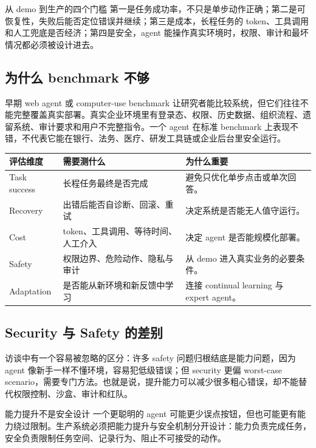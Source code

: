 \documentclass[a4paper]{article}
\begin{document}
\begin{importantbox}{从 demo 到生产的四个门槛}
第一是任务成功率，不只是单步动作正确；第二是可恢复性，失败后能否定位错误并继续；第三是成本，长程任务的 token、工具调用和人工兜底是否经济；第四是安全，agent 能操作真实环境时，权限、审计和最坏情况都必须被设计进去。
\end{importantbox}

\subsection{为什么 benchmark 不够}

早期 web agent 或 computer-use benchmark 让研究者能比较系统，但它们往往不能完整覆盖真实部署。真实企业环境里有登录态、权限、历史数据、组织流程、遗留系统、审计要求和用户不完整指令。一个 agent 在标准 benchmark 上表现不错，不代表它能在银行、法务、医疗、研发工具链或企业后台里安全运行。

\noindent\begin{tabularx}{\textwidth}{p{}p{}X}
\toprule
评估维度 & 需要测什么 & 为什么重要 \\
\midrule
Task success & 长程任务最终是否完成 & 避免只优化单步点击或单次回答。 \\
Recovery & 出错后能否自诊断、回滚、重试 & 决定系统是否能无人值守运行。 \\
Cost & token、工具调用、等待时间、人工介入 & 决定 agent 是否能规模化部署。 \\
Safety & 权限边界、危险动作、隐私与审计 & 从 demo 进入真实业务的必要条件。 \\
Adaptation & 是否能从新环境和新反馈中学习 & 连接 continual learning 与 expert agent。 \\
\bottomrule
\end{tabularx}

\subsection{Security 与 Safety 的差别}

访谈中有一个容易被忽略的区分：许多 safety 问题归根结底是能力问题，因为 agent 像新手一样不懂环境，容易犯低级错误；但 security 更偏 worst-case scenario，需要专门方法。也就是说，提升能力可以减少很多粗心错误，却不能替代权限控制、沙盒、审计和红队。

\begin{warningbox}{能力提升不是安全设计}
一个更聪明的 agent 可能更少误点按钮，但也可能更有能力绕过限制。生产系统必须把能力提升与安全机制分开设计：能力负责完成任务，安全负责限制任务空间、记录行为、阻止不可接受的动作。
\end{warningbox}
\end{document}
